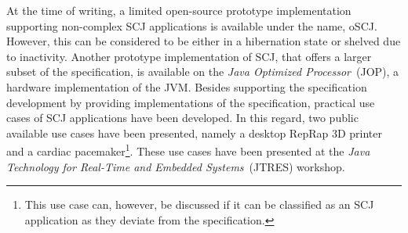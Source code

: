 At the time of writing, a limited open-source prototype implementation supporting non-complex SCJ applications is available under the name, oSCJ\cite{oSCJ}. However, this can be considered to be either in a hibernation state or shelved due to inactivity. Another prototype implementation of SCJ, that offers a larger subset of the specification, is available on the \textit{Java Optimized Processor}~(JOP), a hardware implementation of the JVM\cite{Schoeberl:2012:SCJonJava}. Besides supporting the specification development by providing implementations of the specification, practical use cases of SCJ applications have been developed. In this regard, two public available use cases have been presented, namely a desktop RepRap 3D printer\cite{Schoeberl:2012:RepRap} and a cardiac pacemaker\cite{Singh:2012:CPC:2388936.2388948}\footnote{This use case can, however, be discussed if it can be classified as an SCJ application as they deviate from the specification.}. These use cases have been presented at the \textit{Java Technology for Real-Time and Embedded Systems}~(JTRES) workshop. 



